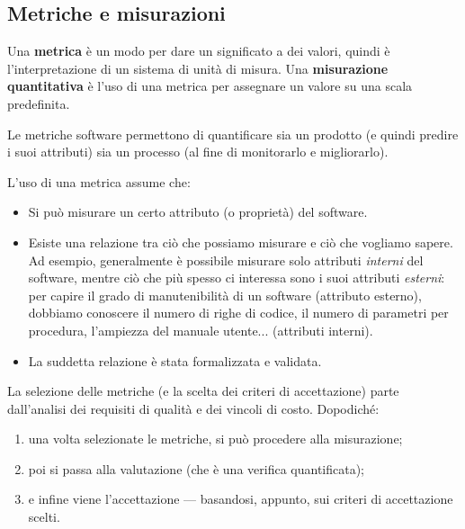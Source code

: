 \documentclass[a4paper]{article}
\begin{document}
		
	\subsection{Metriche e misurazioni}

		
Una \textbf{metrica} è un modo per dare un significato a dei valori, quindi è l'interpretazione di un sistema di unità di misura. Una \textbf{misurazione quantitativa} è l'uso di una metrica per assegnare un valore su una scala predefinita.
		
Le metriche software permettono di quantificare sia un prodotto (e quindi predire i suoi attributi) sia un processo (al fine di monitorarlo e migliorarlo).
		
L'uso di una metrica assume che:
		
	\begin{itemize}
		
			
	\item Si può misurare un certo attributo (o proprietà) del software.
			
	\item Esiste una relazione tra ciò che possiamo misurare e ciò che vogliamo sapere. Ad esempio, generalmente è possibile misurare solo attributi \emph{interni} del software, mentre ciò che più spesso ci interessa sono i suoi attributi \emph{esterni}: per capire il grado di manutenibilità di un software (attributo esterno), dobbiamo conoscere il numero di righe di codice, il numero di parametri per procedura, l'ampiezza del manuale utente... (attributi interni).
			
	\item La suddetta relazione è stata formalizzata e validata.
		
	\end{itemize}

		
La selezione delle metriche (e la scelta dei criteri di accettazione) parte dall'analisi dei requisiti di qualità e dei vincoli di costo. Dopodiché:
		
	\begin{enumerate}
		
			
	\item una volta selezionate le metriche, si può procedere alla misurazione;
			
	\item poi si passa alla valutazione (che è una verifica quantificata);
			
	\item e infine viene l'accettazione — basandosi, appunto, sui criteri di accettazione scelti.
		
	\end{enumerate}
\end{document}
